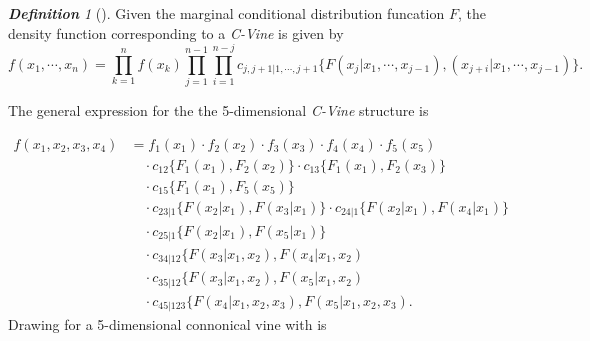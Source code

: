 \documentclass[12pt,oneside,a4paper]{book}
\theoremstyle{definition}
\theoremstyle{remark}
\newtheorem{defn}{\bf Definition}[subsection]
\begin{document}
				\begin{defn}[\cite{aasPaircopulaConstructionsMultiple2009}]
					Given the marginal conditional distribution funcation $F$, the density function corresponding to a \textit{C-Vine} is given by
					\begin{equation}\label{Eq:c_vine_density}
						f\left(x_1, \cdots, x_n \right) = \prod_{k=1}^{n} f\left(x_k\right) \prod_{j=1}^{n-1} \prod_{i=1}^{n-j} c_{j,j+1|1,\cdots,j+1} \{ F\left(x_j | x_1, \cdots, x_{j-1}\right), \left(x_{j+i} | x_1, \cdots, x_{j-1}\right) \}.
					\end{equation}

				\end{defn}
				The general expression for the the 5-dimensional \textit{C-Vine} structure is

				\begin{equation}\label{Eq:5d_c_vine}
					\begin{aligned}
						f\left(x_1, x_2, x_3, x_4\right)
						&= f_1\left(x_1\right) \cdot f_2\left(x_2\right) \cdot f_3\left(x_3\right) \cdot f_4\left(x_4\right) \cdot f_5\left(x_5\right)\\
						&\quad \cdot c_{12}\{ F_1\left(x_1\right), F_2\left(x_2\right) \} \cdot  c_{13}\{ F_1\left(x_1\right), F_2\left(x_3\right) \} \\
						&\quad \cdot  c_{15}\{ F_1\left(x_1\right), F_5\left(x_5\right) \}\\
						&\quad \cdot c_{23|1}\{ F\left(x_2 | x_1\right), F\left(x_3 | x_1\right) \}	\cdot c_{24|1}\{ F\left(x_2 | x_1\right), F\left(x_4 | x_1\right) \}\\
						&\quad \cdot c_{25|1}\{ F\left(x_2 | x_1\right), F\left(x_5 | x_1\right)\}\\
						&\quad \cdot c_{34|12}\{ F\left(x_3 | x_1, x_2\right), F\left(x_4 | x_1, x_2\right)\\
						&\quad \cdot c_{35|12}\{ F\left(x_3 | x_1, x_2\right), F\left(x_5 | x_1, x_2\right)\\
						&\quad \cdot c_{45|123}\{ F\left(x_4 | x_1, x_2, x_3\right), F\left(x_5 | x_1, x_2, x_3\right).
					\end{aligned}
				\end{equation}
				Drawing for a 5-dimensional connonical vine with is
\end{document}
